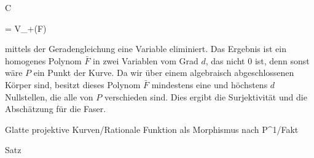 {{\vergleichskette

{ C
}

{ = }{ V_+(F)
}

{  }{
}

{    }{
}

{   }{
}

}
{}{}{}
mittels der Geradengleichung eine Variable eliminiert. Das Ergebnis ist ein homogenes Polynom $\bar{F}$ in zwei Variablen vom Grad $d$, das nicht $0$ ist, denn sonst wäre $P$ ein Punkt der Kurve. Da wir über einem algebraisch abgeschlossenen Körper sind, besitzt dieses Polynom $\bar{F}$ mindestens eine und höchstens $d$ Nullstellen, die alle von $P$ verschieden sind. Dies ergibt die Surjektivität und die Abschätzung für die Faser.


}



{Glatte projektive Kurven/Rationale Funktion als Morphismus nach P^1/Fakt}

{Satz}

{}


